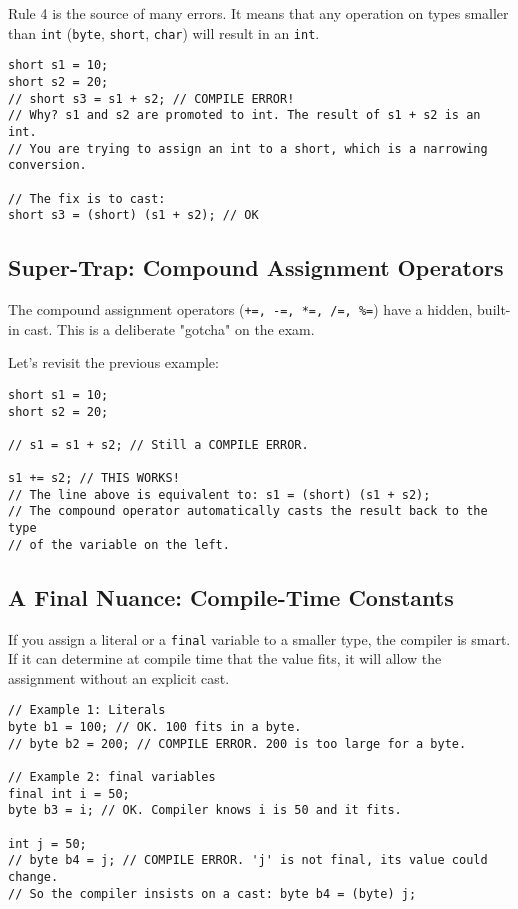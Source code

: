 \documentclass[12pt]{article}
\begin{document}
\begin{enumerate}[label=(\arabic*)]
Rule 4 is the source of many errors. It means that any operation on types smaller than \texttt{int} (\texttt{byte}, \texttt{short}, \texttt{char}) will result in an \texttt{int}.
\begin{verbatim}
short s1 = 10;
short s2 = 20;
// short s3 = s1 + s2; // COMPILE ERROR!
// Why? s1 and s2 are promoted to int. The result of s1 + s2 is an int.
// You are trying to assign an int to a short, which is a narrowing conversion.

// The fix is to cast:
short s3 = (short) (s1 + s2); // OK
\end{verbatim}

\subsection*{Super-Trap: Compound Assignment Operators}
The compound assignment operators (\texttt{+=, -=, *=, /=, \%=}) have a hidden, built-in cast. This is a deliberate "gotcha" on the exam.

Let's revisit the previous example:
\begin{verbatim}
short s1 = 10;
short s2 = 20;

// s1 = s1 + s2; // Still a COMPILE ERROR.

s1 += s2; // THIS WORKS!
// The line above is equivalent to: s1 = (short) (s1 + s2);
// The compound operator automatically casts the result back to the type
// of the variable on the left.
\end{verbatim}

\subsection*{A Final Nuance: Compile-Time Constants}
If you assign a literal or a \texttt{final} variable to a smaller type, the compiler is smart. If it can determine at compile time that the value fits, it will allow the assignment without an explicit cast.

\begin{verbatim}
// Example 1: Literals
byte b1 = 100; // OK. 100 fits in a byte.
// byte b2 = 200; // COMPILE ERROR. 200 is too large for a byte.

// Example 2: final variables
final int i = 50;
byte b3 = i; // OK. Compiler knows i is 50 and it fits.

int j = 50;
// byte b4 = j; // COMPILE ERROR. 'j' is not final, its value could change.
// So the compiler insists on a cast: byte b4 = (byte) j;
\end{verbatim}


\end{enumerate}
\end{document}
